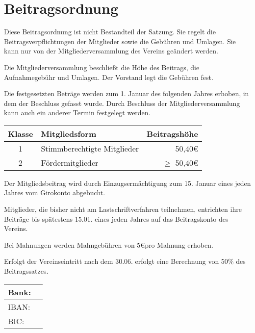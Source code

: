 \section{Beitragsordnung}
\begin{beitrag}

  Diese Beitragsordnung ist nicht Bestandteil der Satzung. Sie regelt die Beitragsverpflichtungen der Mitglieder sowie die Gebühren und Umlagen. Sie kann nur von der Mitgliederversammlung des Vereins geändert werden.

  Die Mitgliederversammlung beschlie\ss{}t die Höhe des Beitrags, die Aufnahmegebühr und Umlagen. Der Vorstand legt die Gebühren fest.

  Die festgesetzten Beträge werden zum 1. Januar des folgenden Jahres erhoben, in dem der Beschluss gefasst wurde. Durch Beschluss der Mitgliederversammlung kann auch ein anderer Termin festgelegt werden.


  \begin{center}
    \begin{tabular}{ |c|l|r| }
      \hline
      Klasse & Mitgliedsform               & Beitragshöhe     \\
      \hline \hline
      1      & Stimmberechtigte Mitglieder & 50,40\euro       \\
      2      & Fördermitglieder            & $\ge$ 50,40\euro \\
      \hline
    \end{tabular}
  \end{center}

  Der Mitgliedsbeitrag wird durch Einzugsermächtigung zum 15. Januar eines jeden Jahres vom Girokonto abgebucht.

  Mitglieder, die bisher nicht am Lastschriftverfahren teilnehmen, entrichten ihre Beiträge bis spätestens 15.01. eines jeden Jahres auf das Beitragskonto des Vereins.

  Bei Mahnungen werden Mahngebühren von 5\euro pro Mahnung erhoben.

  Erfolgt der Vereinseintritt nach dem 30.06. erfolgt eine Berechnung von 50\% des Beitragssatzes.


  \begin{center}
    \begin{tabular}{ |ll| }
      \hline
      Bank: & \\
      \hline
      IBAN: & \\
      \hline
      BIC:  & \\
      \hline
    \end{tabular}
  \end{center}


\end{beitrag}
